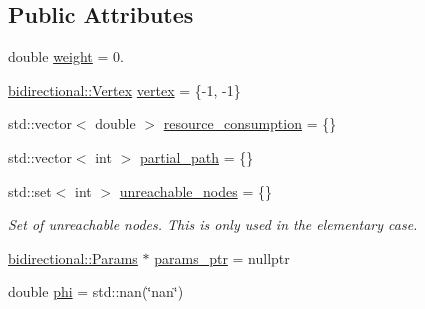 \subsection*{Public Attributes}
\begin{DoxyCompactItemize}
\item 
double \hyperlink{classlabelling_1_1Label_a478f34a67528586877720483c5f0d38b}{weight} = 0.
\item 
\hyperlink{structbidirectional_1_1Vertex}{bidirectional\+::\+Vertex} \hyperlink{classlabelling_1_1Label_a7c8972ee9d1c00fd348025c321467f75}{vertex} = \{-\/1, -\/1\}
\item 
std\+::vector$<$ double $>$ \hyperlink{classlabelling_1_1Label_a2c185387fad46a29bce3dd99b111a1c4}{resource\+\_\+consumption} = \{\}
\item 
std\+::vector$<$ int $>$ \hyperlink{classlabelling_1_1Label_a7511d29a3aa0272b1a0e1ea5fb75ff14}{partial\+\_\+path} = \{\}
\item 
std\+::set$<$ int $>$ \hyperlink{classlabelling_1_1Label_ae684804e463fe690b4fe6ee32812e123}{unreachable\+\_\+nodes} = \{\}
\begin{DoxyCompactList}\small\item\em Set of unreachable nodes. This is only used in the elementary case. \end{DoxyCompactList}\item 
\hyperlink{classbidirectional_1_1Params}{bidirectional\+::\+Params} $\ast$ \hyperlink{classlabelling_1_1Label_a182759fd08c2536f9e6a2614c790b127}{params\+\_\+ptr} = nullptr
\item 
double \hyperlink{classlabelling_1_1Label_a632cd90937f05a8ea69ad60d4c103c66}{phi} = std\+::nan(\char`\"{}nan\char`\"{})
\end{DoxyCompactItemize}

